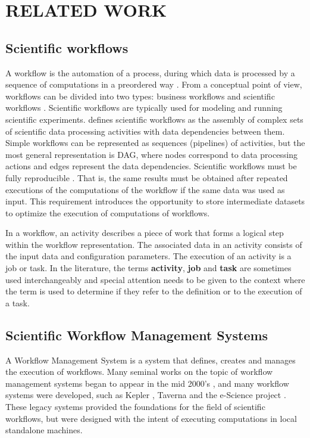 \chapter{RELATED WORK}
\label{chap:related}
\section{Scientific workflows}
A workflow is the automation of a process, during which data is processed by a sequence of computations in a preordered way \citep{liu2015survey}. From a conceptual point of view, workflows can be divided into two types: business workflows and scientific workflows \citep{hollingsworth1995workflow, taylor2014workflows}. Scientific workflows are typically used for modeling and running scientific experiments. \cite{taylor2014workflows} defines scientific workflows as the assembly of complex sets of scientific data processing activities with data dependencies between them. Simple workflows can be represented as sequences (pipelines) of activities, but the most general representation is DAG, where nodes correspond to data processing actions and edges represent the data dependencies.  Scientific workflows must be fully reproducible \citep{barker2007scientific}. That is, the same results must be obtained after repeated executions of the computations of the workflow if the same data was used as input. This requirement introduces the opportunity to store intermediate datasets to optimize the execution of computations of workflows.

In a workflow, an activity describes a piece of work that forms a logical step within the workflow representation.  The associated data in an activity consists of the input data and configuration parameters.  The execution of an activity is a job or task. In the literature, the terms \textbf{activity}, \textbf{job} and \textbf{task} are sometimes used interchangeably and special attention needs to be given to the context where the term is used to determine if they refer to the definition or to the execution of a task.
 
\section{Scientific Workflow Management Systems}
A Workflow Management System is a system that defines, creates and manages the execution of workflows. Many seminal works on the topic of workflow management systems began to appear in the mid 2000's \citep[e.g.]{yu2005taxonomy, fox2006special, gil2007examining}, and many workflow systems were developed, such as Kepler \citep{altintas2004kepler}, Taverna \citep{oinn2006taverna} and the e-Science project \citep{deelman2009workflows}. These legacy systems provided the foundations for the field of scientific workflows, but were designed with the intent of executing computations in local standalone machines.

